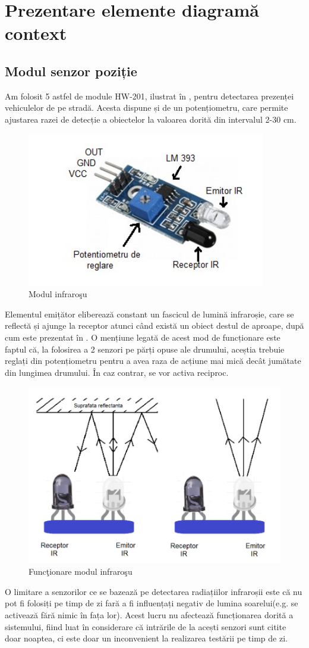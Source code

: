 \section{Prezentare elemente diagram\u{a} context}
\subsection{Modul senzor poziție} \label{senzorir}
 Am folosit 5 astfel de module HW-201, ilustrat în , pentru detectarea prezenței vehiculelor de pe stradă. Acesta dispune și de un potențiometru, care permite ajustarea razei de detecție a obiectelor la valoarea dorită din intervalul 2-30 cm.

\begin{figure}[!ht]
    \centering
    \includegraphics[width=0.4\linewidth,keepaspectratio]{pics/SenzorIR.jpg}
    \caption{Modul infraro\c{s}u}
    \label{fig:IR1}
\end{figure}

Elementul emițător eliberează constant un fascicul de lumină infraroșie, care se reflectă și ajunge la receptor atunci când există un obiect destul de aproape, după cum este prezentat în . O mențiune legată de acest mod de funcționare este faptul că, la folosirea a 2 senzori pe părți opuse ale drumului, aceștia trebuie reglați din potențiometru pentru a avea raza de acțiune mai mică decât jumătate din lungimea drumului. În caz contrar, se vor activa reciproc.

\begin{figure}[!ht]
    \centering
    \includegraphics[width=0.6\linewidth,keepaspectratio]{pics/senzorIR2.jpg}
    \caption{Func\c{t}ionare modul infraro\c{s}u}
    \label{fig:IR2}
\end{figure}
O limitare a senzorilor ce se bazează pe detectarea radiațiilor infraroșii este că nu pot fi folosiți pe timp de zi fară a fi influențați negativ de lumina soarelui(e.g. se activează fără nimic în fața lor). Acest lucru nu afectează funcționarea dorită a sistemului, fiind luat în considerare că intrările de la acești senzori sunt citite doar noaptea, ci este doar un inconvenient la realizarea testării pe timp de zi.

